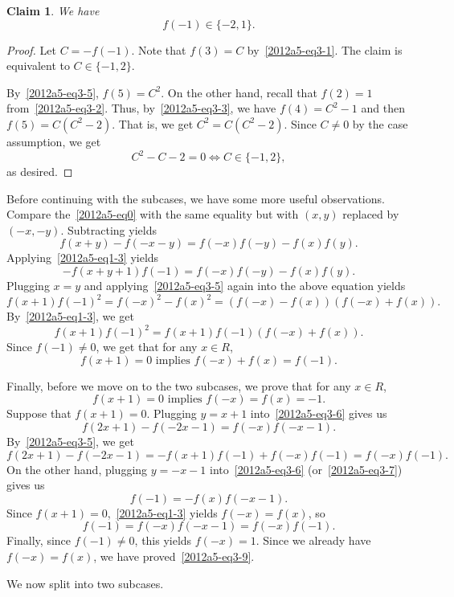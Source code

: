 \documentclass{article}
\newtheorem*{claim}{Claim}
\begin{document}
\begin{claim}
We have \[ f(-1) \in \{-2, 1\}. \]
\end{claim}
\begin{proof}
Let $C = -f(-1)$.
Note that $f(3) = C$ by~\eqref{2012a5-eq3-1}.
The claim is equivalent to $C \in \{-1, 2\}$.

By~\eqref{2012a5-eq3-5}, $f(5) = C^2$.
On the other hand, recall that $f(2) = 1$ from~\eqref{2012a5-eq3-2}.
Thus, by~\eqref{2012a5-eq3-3}, we have $f(4) = C^2 - 1$ and then $f(5) = C (C^2 - 2)$.
That is, we get $C^2 = C(C^2 - 2)$.
Since $C \neq 0$ by the case assumption, we get
\[ C^2 - C - 2 = 0 \iff C \in \{-1, 2\}, \]
    as desired.
\end{proof}

Before continuing with the subcases, we have some more useful observations.
Compare the~\eqref{2012a5-eq0} with the same equality but with $(x, y)$ replaced by $(-x, -y)$.
Subtracting yields
\[ f(x + y) - f(-x - y) = f(-x) f(-y) - f(x) f(y). \tag{3.6}\label{2012a5-eq3-6} \]
Applying~\eqref{2012a5-eq1-3} yields
\[ -f(x + y + 1) f(-1) = f(-x) f(-y) - f(x) f(y). \tag{3.7}\label{2012a5-eq3-7} \]
Plugging $x = y$ and applying~\eqref{2012a5-eq3-5} again into the above equation yields
\[ f(x + 1) f(-1)^2 = f(-x)^2 - f(x)^2 = (f(-x) - f(x)) (f(-x) + f(x)). \]
By~\eqref{2012a5-eq1-3}, we get
\[ f(x + 1) f(-1)^2 = f(x + 1) f(-1) (f(-x) + f(x)). \]
Since $f(-1) \neq 0$, we get that for any $x \in R$,
\[ f(x + 1) = 0 \text{ implies } f(-x) + f(x) = f(-1). \tag{3.8}\label{2012a5-eq3-8} \]

Finally, before we move on to the two subcases, we prove that for any $x \in R$,
\[ f(x + 1) = 0 \text{ implies } f(-x) = f(x) = -1. \tag{3.9}\label{2012a5-eq3-9} \]
Suppose that $f(x + 1) = 0$.
Plugging $y = x + 1$ into~\eqref{2012a5-eq3-6} gives us
\[ f(2x + 1) - f(-2x - 1) = f(-x) f(-x - 1). \]
By~\eqref{2012a5-eq3-5}, we get
\[ f(2x + 1) - f(-2x - 1) = -f(x + 1) f(-1) + f(-x) f(-1) = f(-x) f(-1). \]
On the other hand, plugging $y = -x - 1$ into~\eqref{2012a5-eq3-6} (or~\eqref{2012a5-eq3-7}) gives us
\[ f(-1) = -f(x) f(-x - 1). \]
Since $f(x + 1) = 0$,~\eqref{2012a5-eq1-3} yields $f(-x) = f(x)$, so
\[ f(-1) = f(-x) f(-x - 1) = f(-x) f(-1). \]
Finally, since $f(-1) \neq 0$, this yields $f(-x) = 1$.
Since we already have $f(-x) = f(x)$, we have proved~\eqref{2012a5-eq3-9}.

We now split into two subcases.
\end{document}
